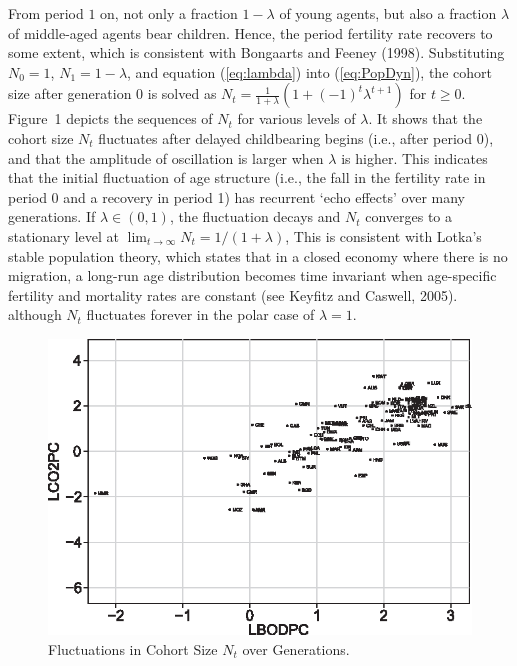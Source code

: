 \documentclass[nogrid]{MBE}%
\begin{document}
{From period $1$ on, not only a fraction $1-\lambda$ of young agents, but also a fraction $\lambda$
of middle-aged agents bear children. Hence, the period fertility rate recovers to some extent,
which is consistent with Bongaarts and Feeney (1998). Substituting $N_{0}=1$, $N_{1}=1-\lambda$,
and equation (\ref{eq:lambda}) into (\ref{eq:PopDyn}), the cohort size after generation 0 is
solved as $N_{t}=\frac{1}{1+\lambda}\left(  1+\left(  -1\right) ^{t}\lambda^{t+1}\right)  $ for
$t\geq0$. Figure~1 depicts the sequences of $N_{t}$ for various levels of $\lambda$. It shows that
the cohort size $N_{t}$ fluctuates after delayed childbearing begins (i.e., after period 0), and
that the amplitude of oscillation is larger when $\lambda$ is higher. This indicates that the
initial fluctuation of age structure (i.e., the fall in the fertility rate in period 0 and a
recovery in period 1) has recurrent `echo effects' over many generations. If $\lambda\in\left(
0,1\right)  $, the fluctuation decays and $N_{t}$ converges to a stationary level at
$\lim_{t\rightarrow\infty}N_{t}={1}/({1+\lambda})$, {This is consistent with Lotka's stable
population theory, which states that in a closed economy where there is no migration, a long-run
age distribution becomes time invariant when age-specific fertility and mortality rates are
constant (see Keyfitz and Caswell, 2005).} although $N_{t}$ fluctuates forever in the polar case
of $\lambda=1$.

\begin{figure}[t]
\begin{center}
\includegraphics[height=0.4\textheight]{flrf1.eps}
\end{center}
\caption{Fluctuations in Cohort Size $N_{t}$ over Generations.}%
\label{fig:kgrid}%
\end{figure}

}
\end{document}
